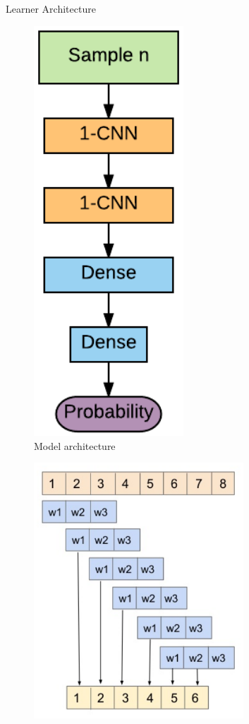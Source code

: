 \documentclass[notes]{beamer}
\begin{document}
\begin{frame}{Learner Architecture}
\begin{minipage}{0.45\textwidth}
	\begin{figure}
		\includegraphics[width=0.5\textwidth]{figures/cnn_sabater}
		\caption{Model architecture}
	\end{figure}
\end{minipage}
\begin{minipage}{0.45\textwidth}
	\begin{figure}
		\includegraphics[width=0.7\textwidth]{figures/1dconv_nopad}

\end{figure}
\end{minipage}
\end{frame}
\end{document}
